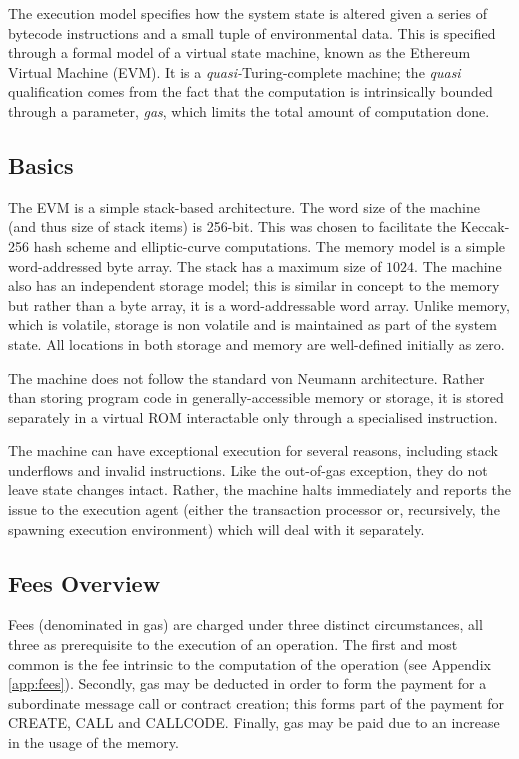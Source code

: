 \documentclass[9pt,oneside]{amsart}
\begin{document}
\begin{multicols}{2}
The execution model specifies how the system state is altered given a series of bytecode instructions and a small tuple of environmental data. This is specified through a formal model of a virtual state machine, known as the Ethereum Virtual Machine (EVM). It is a \textit{quasi-}Turing-complete machine; the \textit{quasi} qualification comes from the fact that the computation is intrinsically bounded through a parameter, \textit{gas}, which limits the total amount of computation done.

\subsection{Basics}

The EVM is a simple stack-based architecture. The word size of the machine (and thus size of stack items) is 256-bit. This was chosen to facilitate the Keccak-256 hash scheme and elliptic-curve computations. The memory model is a simple word-addressed byte array. The stack has a maximum size of $1024$. The machine also has an independent storage model; this is similar in concept to the memory but rather than a byte array, it is a word-addressable word array. Unlike memory, which is volatile, storage is non volatile and is maintained as part of the system state. All locations in both storage and memory are well-defined initially as zero.

The machine does not follow the standard von Neumann architecture. Rather than storing program code in generally-accessible memory or storage, it is stored separately in a virtual ROM interactable only through a specialised instruction.

The machine can have exceptional execution for several reasons, including stack underflows and invalid instructions. Like the out-of-gas exception, they do not leave state changes intact. Rather, the machine halts immediately and reports the issue to the execution agent (either the transaction processor or, recursively, the spawning execution environment) which will deal with it separately.

\subsection{Fees Overview}

Fees (denominated in gas) are charged under three distinct circumstances, all three as prerequisite to the execution of an operation. The first and most common is the fee intrinsic to the computation of the operation (see Appendix \ref{app:fees}). Secondly, gas may be deducted in order to form the payment for a subordinate message call or contract creation; this forms part of the payment for {\small CREATE}, {\small CALL} and {\small CALLCODE}. Finally, gas may be paid due to an increase in the usage of the memory.


\end{multicols}
\end{document}
